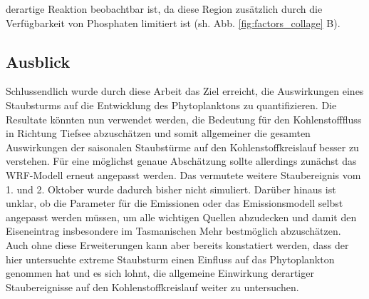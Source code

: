 \documentclass[12pt,a4paper,onecolumn,headheight=30pt]{scrartcl}
\begin{document}
derartige Reaktion beobachtbar ist, da diese Region zusätzlich durch die Verfügbarkeit von Phosphaten limitiert ist (sh. Abb. \ref{fig:factors_collage} B). \\
\subsection{Ausblick}
Schlussendlich wurde durch diese Arbeit das Ziel erreicht, die Auswirkungen eines Staubsturms auf die Entwicklung des Phytoplanktons zu quantifizieren. Die Resultate könnten nun verwendet werden, die Bedeutung für den Kohlenstofffluss in Richtung Tiefsee abzuschätzen und somit allgemeiner die gesamten Auswirkungen der saisonalen Staubstürme auf den Kohlenstoffkreislauf besser zu verstehen. Für eine möglichst genaue Abschätzung sollte allerdings zunächst das WRF-Modell erneut angepasst werden. Das vermutete weitere Staubereignis vom 1. und 2. Oktober wurde dadurch bisher nicht simuliert. Darüber hinaus ist unklar, ob die Parameter für die Emissionen oder das Emissionsmodell selbst angepasst werden müssen, um alle wichtigen Quellen abzudecken und damit den Eiseneintrag insbesondere im Tasmanischen Mehr bestmöglich abzuschätzen. Auch ohne diese Erweiterungen kann aber bereits konstatiert werden, dass der hier untersuchte extreme Staubsturm einen Einfluss auf das Phytoplankton genommen hat und es sich lohnt, die allgemeine Einwirkung derartiger Staubereignisse auf den Kohlenstoffkreislauf weiter zu untersuchen.

\newpage
\printbibliography
\appendix

\newpage
\end{document}
